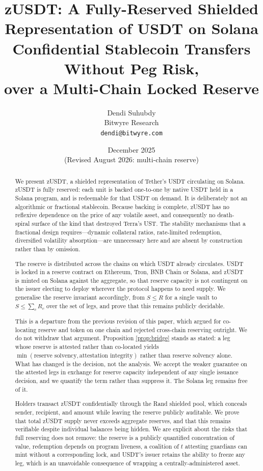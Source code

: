 \documentclass[11pt,a4paper]{article}
\title{\textbf{zUSDT: A Fully-Reserved Shielded Representation of USDT on Solana}\\[0.5em]
\large Confidential Stablecoin Transfers Without Peg Risk,\\over a Multi-Chain Locked Reserve}
\author{Dendi Suhubdy\\
Bitwyre Research\\
\texttt{dendi@bitwyre.com}}
\date{December 2025 \\ \small (Revised August 2026: multi-chain reserve)}
\begin{document}
\maketitle

\begin{abstract}
We present zUSDT, a shielded representation of Tether's USDT circulating on Solana. zUSDT is fully reserved: each unit is backed one-to-one by native USDT held in a Solana program, and is redeemable for that USDT on demand. It is deliberately not an algorithmic or fractional stablecoin. Because backing is complete, zUSDT has no reflexive dependence on the price of any volatile asset, and consequently no death-spiral surface of the kind that destroyed Terra's UST. The stability mechanisms that a fractional design requires---dynamic collateral ratios, rate-limited redemption, diversified volatility absorption---are unnecessary here and are absent by construction rather than by omission.

The reserve is distributed across the chains on which USDT already circulates. USDT is locked in a reserve contract on Ethereum, Tron, BNB Chain or Solana, and zUSDT is minted on Solana against the aggregate, so that reserve capacity is not contingent on the issuer electing to deploy wherever the protocol happens to need supply. We generalise the reserve invariant accordingly, from $S \leq R$ for a single vault to $S \leq \sum_{c} R_c$ over the set of legs, and prove that this remains publicly decidable.

This is a departure from the previous revision of this paper, which argued for co-locating reserve and token on one chain and rejected cross-chain reserving outright. We do not withdraw that argument. Proposition \ref{prop:bridge} stands as stated: a leg whose reserve is attested rather than co-located yields $\min(\text{reserve solvency}, \text{attestation integrity})$ rather than reserve solvency alone. What has changed is the decision, not the analysis. We accept the weaker guarantee on the attested legs in exchange for reserve capacity independent of any single issuance decision, and we quantify the term rather than suppress it. The Solana leg remains free of it.

Holders transact zUSDT confidentially through the Rand shielded pool, which conceals sender, recipient, and amount while leaving the reserve publicly auditable. We prove that total zUSDT supply never exceeds aggregate reserves, and that this remains verifiable despite individual balances being hidden. We are explicit about the risks that full reserving does not remove: the reserve is a publicly quantified concentration of value, redemption depends on program liveness, a coalition of $t$ attesting guardians can mint without a corresponding lock, and USDT's issuer retains the ability to freeze any leg, which is an unavoidable consequence of wrapping a centrally-administered asset.
\end{abstract}
\end{document}
